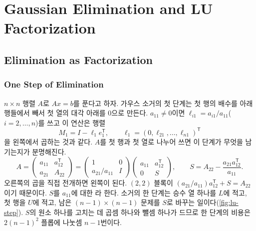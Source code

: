 \chapter{Gaussian Elimination and LU Factorization}
\label{ch:lu}


\section{Elimination as Factorization}
\label{sec:lu-factorization}

\subsection{One Step of Elimination}

$n\times n$ 행렬 $A$로 $Ax=b$를 푼다고 하자. 가우스 소거의 첫 단계는 첫 행의 배수를 아래 행들에서 빼서 첫 열의 대각 아래를 $0$으로 만든다. $a_{11}\ne0$이면  $\ell_{i1}=a_{i1}/a_{11}$($i=2,\dots,n$)를 쓰고 이 연산은 행렬
\[
M_1=I-\ell_1e_1^{\mathsf T},\qquad \ell_1=(0,\ell_{21},\dots,\ell_{n1})^{\mathsf T}
\]
을 왼쪽에서 곱하는 것과 같다. $A$를 첫 행과 첫 열로 나누어 쓰면 이 단계가 무엇을 남기는지가 분명해진다.
\begin{equation}
\label{eq:lu-schur-step}
A=\begin{pmatrix}a_{11}&a_{12}^{\mathsf T}\\a_{21}&A_{22}\end{pmatrix}
=\begin{pmatrix}1&0\\a_{21}/a_{11}&I\end{pmatrix}
\begin{pmatrix}a_{11}&a_{12}^{\mathsf T}\\0&S\end{pmatrix},\qquad
S=A_{22}-\frac{a_{21}a_{12}^{\mathsf T}}{a_{11}}.
\end{equation}
오른쪽의 곱을 직접 전개하면 왼쪽이 된다. $(2,2)$ 블록이 $(a_{21}/a_{11})a_{12}^{\mathsf T}+S=A_{22}$이기 때문이다. $S$를 $a_{11}$에 대한 라 한다. 소거의 한 단계는 승수 열 하나를 $L$에 적고, 첫 행을 $U$에 적고, 남은 $(n-1)\times(n-1)$ 문제를 $S$로 바꾸는 일이다(\cref{fig:lu-step}). $S$의 원소 하나를 고치는 데 곱셈 하나와 뺄셈 하나가 드므로 한 단계의 비용은 $2(n-1)^2$ 플롭에 나눗셈 $n-1$번이다.

